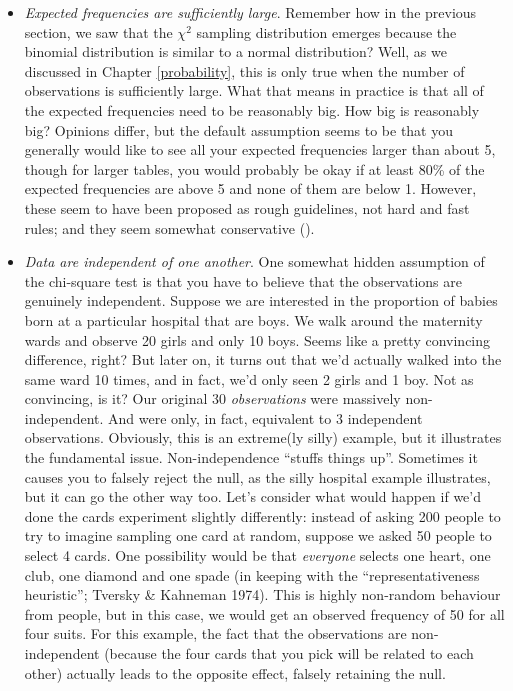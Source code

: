 \documentclass[
  11pt,
  a4paper,
  twoside,symmetric,openright]{book}
\providecommand{\tightlist}{%
  \setlength{\itemsep}{0pt}\setlength{\parskip}{0pt}}
\theoremstyle{break}
\theoremstyle{break}
\begin{document}
\begin{itemize}
\tightlist
\item
  \emph{Expected frequencies are sufficiently large}. Remember how in the previous section, we saw that the \(\chi^2\) sampling distribution emerges because the binomial distribution is similar to a normal distribution? Well, as we discussed in Chapter \ref{probability}, this is only true when the number of observations is sufficiently large. What that means in practice is that all of the expected frequencies need to be reasonably big. How big is reasonably big? Opinions differ, but the default assumption seems to be that you generally would like to see all your expected frequencies larger than about 5, though for larger tables, you would probably be okay if at least 80\% of the expected frequencies are above 5 and none of them are below 1. However, these seem to have been proposed as rough guidelines, not hard and fast rules; and they seem somewhat conservative ().
\item
  \emph{Data are independent of one another}. One somewhat hidden assumption of the chi-square test is that you have to believe that the observations are genuinely independent. Suppose we are interested in the proportion of babies born at a particular hospital that are boys. We walk around the maternity wards and observe 20 girls and only 10 boys. Seems like a pretty convincing difference, right? But later on, it turns out that we'd actually walked into the same ward 10 times, and in fact, we'd only seen 2 girls and 1 boy. Not as convincing, is it? Our original 30 \emph{observations} were massively non-independent. And were only, in fact, equivalent to 3 independent observations. Obviously, this is an extreme(ly silly) example, but it illustrates the fundamental issue. Non-independence ``stuffs things up''. Sometimes it causes you to falsely reject the null, as the silly hospital example illustrates, but it can go the other way too. Let's consider what would happen if we'd done the cards experiment slightly differently: instead of asking 200 people to try to imagine sampling one card at random, suppose we asked 50 people to select 4 cards. One possibility would be that \emph{everyone} selects one heart, one club, one diamond and one spade (in keeping with the ``representativeness heuristic''; Tversky \& Kahneman 1974). This is highly non-random behaviour from people, but in this case, we would get an observed frequency of 50 for all four suits. For this example, the fact that the observations are non-independent (because the four cards that you pick will be related to each other) actually leads to the opposite effect, falsely retaining the null.
\end{itemize}
\end{document}
